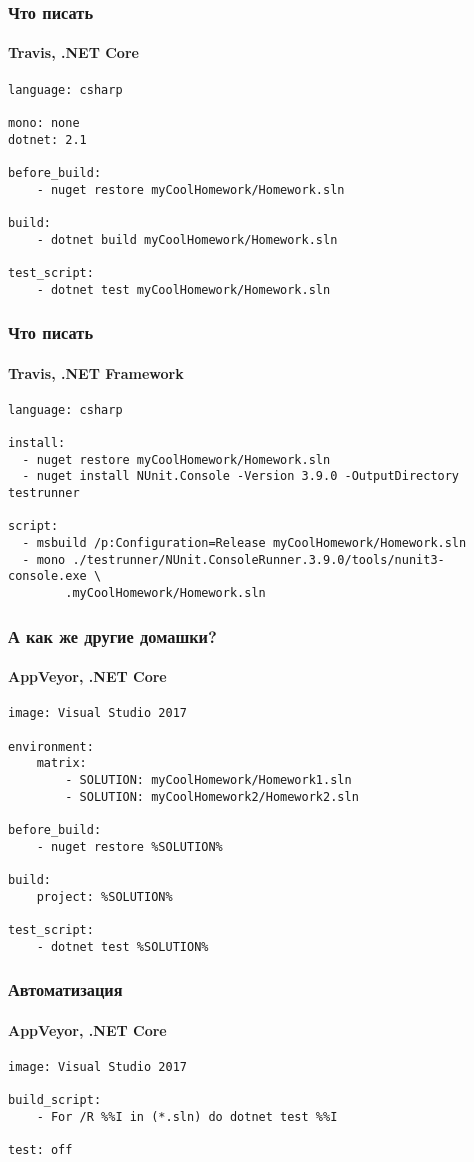 \documentclass[xetex,mathserif,serif]{beamer}
\begin{document}
	\begin{frame}[fragile]
		\frametitle{Что писать}
		\framesubtitle{Travis, .NET Core}
		\begin{verbatim}
language: csharp

mono: none
dotnet: 2.1

before_build: 
    - nuget restore myCoolHomework/Homework.sln

build: 
    - dotnet build myCoolHomework/Homework.sln

test_script: 
    - dotnet test myCoolHomework/Homework.sln
		\end{verbatim}
	\end{frame}

	\begin{frame}[fragile]
		\frametitle{Что писать}
		\framesubtitle{Travis, .NET Framework}
		\begin{small}
			\begin{verbatim}
language: csharp

install:
  - nuget restore myCoolHomework/Homework.sln
  - nuget install NUnit.Console -Version 3.9.0 -OutputDirectory testrunner

script:
  - msbuild /p:Configuration=Release myCoolHomework/Homework.sln
  - mono ./testrunner/NUnit.ConsoleRunner.3.9.0/tools/nunit3-console.exe \
        .myCoolHomework/Homework.sln
			\end{verbatim}
		\end{small}
	\end{frame}

	\begin{frame}[fragile]
		\frametitle{А как же другие домашки?}
		\framesubtitle{AppVeyor, .NET Core}
		\begin{verbatim}
image: Visual Studio 2017 

environment:
    matrix:
        - SOLUTION: myCoolHomework/Homework1.sln
        - SOLUTION: myCoolHomework2/Homework2.sln

before_build: 
    - nuget restore %SOLUTION%

build: 
    project: %SOLUTION%

test_script: 
    - dotnet test %SOLUTION%
		\end{verbatim}
	\end{frame}

	\begin{frame}[fragile]
		\frametitle{Автоматизация}
		\framesubtitle{AppVeyor, .NET Core}
		\begin{verbatim}
image: Visual Studio 2017 

build_script: 
    - For /R %%I in (*.sln) do dotnet test %%I

test: off
		\end{verbatim}
	\end{frame}
\end{document}
